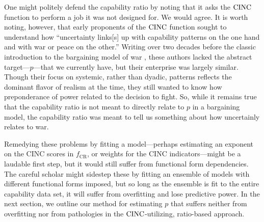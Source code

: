 One might politely defend the capability ratio by noting that it asks the $\operatorname{CINC}$ function to perform a job it was not designed for. 
We would agree. 
It is worth noting, however, that early proponents of the $\operatorname{CINC}$ function \citep[24]{singer1972} sought to understand how ``uncertainty links[s] up with capability patterns on the one hand and with war or peace on the other.'' 
Writing over two decades before the classic introduction to the bargaining model of war \citep{fearon1995}, these authors lacked the abstract target---$p$---that we currently have, but their enterprise was largely similar. 
Though their focus on systemic, rather than dyadic, patterns reflects the dominant flavor of realism at the time, they still wanted to know how preponderance of power related to the decision to fight. 
So, while it remains true that the capability ratio is not meant to directly relate to $p$ in a bargaining model, the capability ratio was meant to tell us something about how uncertainly relates to war.

Remedying these problems by fitting a model---perhaps estimating an exponent on the CINC scores in $f_{\text{CR}}$, or weights for the CINC indicators---might be a laudable first step, but it would still suffer from functional form dependencies. 
The careful scholar might sidestep these by fitting an ensemble of models with different functional forms imposed, but so long as the ensemble is fit to the entire capability data set, it will suffer from overfitting and lose predictive power. 
In the next section, we outline our method for estimating $p$ that suffers neither from overfitting nor from pathologies in the $\operatorname{CINC}$-utilizing, ratio-based approach. 

